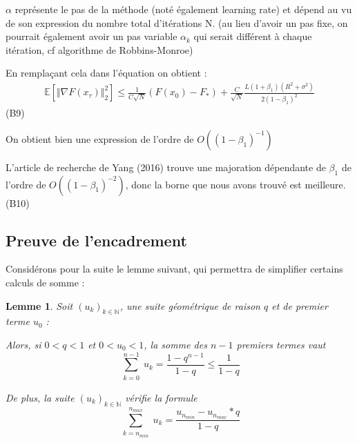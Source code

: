 \documentclass{article}
\begin{document}
\bigskip

$\alpha$ représente le pas de la méthode (noté également learning rate) et dépend au vu de son expression du nombre total d'itérations N. (au lieu d'avoir un pas fixe, on pourrait également avoir un pas variable $\alpha_k$ qui serait différent à chaque itération, cf algorithme de Robbins-Monroe)


\bigskip

En remplaçant cela dans l'équation on obtient : 
\begin{eqnarray*}
    \mathbb{E}[ \Vert \nabla F(x_\tau) \Vert ^2_2] \leq \frac{1}{C \sqrt{N}} (F(x_0)-F_*) + \frac{C }{\sqrt{N}} \frac{ L (1+ \beta_1) (R^2+ \sigma^2)}{2(1- \beta_1)^2} 
\end{eqnarray*} \hspace{\fill}(B9) 


\bigskip

On obtient bien une expression de l'ordre de $O((1-\beta_1)^{-1})$

\bigskip

L'article de recherche de Yang (2016) trouve une majoration dépendante de $\beta_1$ de l'ordre de $O((1-\beta_1)^{-2})$, donc la borne que nous avons trouvé est meilleure. \hspace{\fill}(B10) 

\bigskip

\subsection{Preuve de l'encadrement}

Considérons pour la suite le lemme suivant, qui permettra de simplifier certains calculs de somme :

\bigskip

\newtheorem{theo56}{Lemme}
\begin{theo56}

Soit $(u_k)_{k \in \mathbb{N}}$, une suite géométrique de raison $q$ et de premier terme $u_0$ :

\bigskip

Alors, si $0<q<1$ et $0<u_0<1$,  la somme des $n-1$ premiers termes vaut 
\begin{equation}
    \sum\limits_{\substack {k=0}}^{n-1} u_k = \frac{1-q^{n-1}}{1-q} \leq \frac{1}{1-q}
\end{equation}


\bigskip

De plus, la suite $(u_k)_{k \in \mathbb{N}}$ vérifie la formule 
\begin{equation}
    \sum\limits_{\substack {k=n_{min}}}^{n_{max}} u_k = \frac{u_n_{min} - u_{n_{max}} * q}{1-q}
\end{equation}


\end{theo56}
\end{document}
